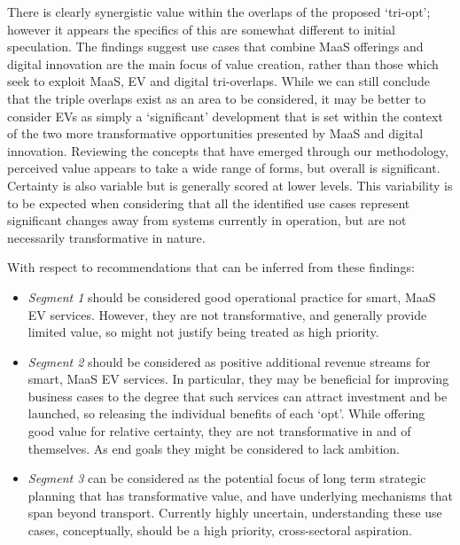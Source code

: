\documentclass[b5paper,10pt]{article}
\begin{document}

There is clearly synergistic value within the overlaps of the proposed
`tri-opt'; however it appears the specifics of this are somewhat
different to initial speculation. The findings suggest use cases that
combine MaaS offerings and digital innovation are the main focus of
value creation, rather than those which seek to exploit MaaS, EV and
digital tri-overlaps. While we can still conclude that the triple
overlaps exist as an area to be considered, it may be better to
consider EVs as simply a `significant' development that is set within
the context of the two more transformative opportunities presented by
MaaS and digital innovation. Reviewing the concepts that have emerged
through our methodology, perceived value appears to take a wide range
of forms, but overall is significant. Certainty is also variable but
is generally scored at lower levels. This variability is to be
expected when considering that all the identified use cases represent
significant changes away from systems currently in operation, but are not
necessarily transformative in nature.

With respect to recommendations that can be inferred from these findings:

\begin{itemize}
\item {\emph{Segment 1}} should be considered good operational
practice for smart, MaaS EV services. However, they are not
transformative, and generally provide limited value, so might not
justify being treated as high priority.
\item {\emph{Segment 2}} should be considered as positive additional
revenue streams for smart, MaaS EV services. In particular, they may
be beneficial for improving business cases to the degree that such
services can attract investment and be launched, so releasing the
individual benefits of each `opt'. While offering good value for
relative certainty, they are not transformative in and of themselves.
As end goals they might be considered to lack ambition.
\item {\emph{Segment 3}} can be considered as the potential focus of
long term strategic planning that has transformative value, and have
underlying mechanisms that span beyond transport. Currently highly
uncertain, understanding these use cases, conceptually, should be a
high priority, cross-sectoral aspiration.
\end{itemize}
\end{document}
